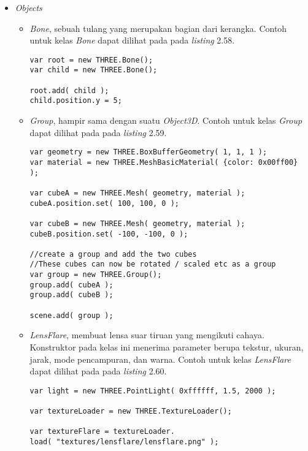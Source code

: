 \begin{itemize}
\begin{itemize}
	\end{itemize}


\item \textit{Objects}

	\begin{itemize}
	\item {\it Bone}, sebuah tulang yang merupakan bagian dari kerangka. Contoh untuk kelas {\it Bone} dapat dilihat pada pada {\it listing} 2.58.
	
\begin{lstlisting}[caption={Contoh penggunaan kelas {\it Bone}.},captionpos=b]
var root = new THREE.Bone();
var child = new THREE.Bone();

root.add( child );
child.position.y = 5;
\end{lstlisting}
	
	\item {\it Group}, hampir sama dengan suatu {\it Object3D}. Contoh untuk kelas {\it Group} dapat dilihat pada pada {\it listing} 2.59.
	
\begin{lstlisting}[caption={Contoh penggunaan kelas {\it Group}.},captionpos=b]
var geometry = new THREE.BoxBufferGeometry( 1, 1, 1 );
var material = new THREE.MeshBasicMaterial( {color: 0x00ff00} );

var cubeA = new THREE.Mesh( geometry, material );
cubeA.position.set( 100, 100, 0 );

var cubeB = new THREE.Mesh( geometry, material );
cubeB.position.set( -100, -100, 0 );

//create a group and add the two cubes
//These cubes can now be rotated / scaled etc as a group
var group = new THREE.Group();
group.add( cubeA );
group.add( cubeB );

scene.add( group );
\end{lstlisting}
	
	\item {\it LensFlare}, membuat lensa suar tiruan yang mengikuti cahaya. Konstruktor pada kelas ini menerima parameter berupa tekstur, ukuran, jarak, mode pencampuran, dan warna. Contoh untuk kelas {\it LensFlare} dapat dilihat pada pada {\it listing} 2.60.
	
\begin{lstlisting}[caption={Contoh penggunaan kelas {\it LensFlare}.},captionpos=b]
var light = new THREE.PointLight( 0xffffff, 1.5, 2000 );

var textureLoader = new THREE.TextureLoader();

var textureFlare = textureLoader.
load( "textures/lensflare/lensflare.png" );


\end{lstlisting}
\end{itemize}
\end{itemize}

